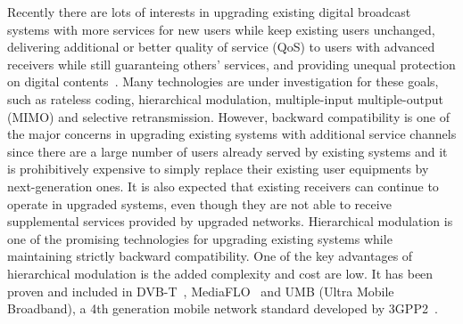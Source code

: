 \documentclass[10pt,fleqn, twocolumn]{IEEEtran}
\begin{document}
Recently there are lots of interests in upgrading existing digital
broadcast systems with more services for new users while keep
existing users unchanged, delivering  additional or better quality
of service (QoS) to users with advanced receivers while still
guaranteing others' services, and providing unequal protection on
digital contents~\cite{DVB,MediaFLO,Jiang05,UMB}. Many
technologies are under investigation for these goals, such as
rateless coding, hierarchical modulation, multiple-input
multiple-output (MIMO) and selective retransmission. However,
backward compatibility is one of the major concerns in upgrading
existing systems with additional service channels since there are
a large number of users already served by existing systems and it
is prohibitively expensive to simply replace their existing user
equipments by next-generation ones. It is also expected that
existing receivers can continue to operate in upgraded systems,
even though they are not able to receive supplemental services
provided by upgraded networks. Hierarchical modulation is one of
the promising technologies for upgrading existing systems while
maintaining strictly backward compatibility. One of the key
advantages of hierarchical modulation is the added complexity and
cost are low. It has been proven and included in DVB-T~\cite{DVB},
MediaFLO~\cite{MediaFLO} and UMB (Ultra Mobile Broadband), a 4th
generation mobile network standard developed by 3GPP2~\cite{UMB}.
\end{document}
